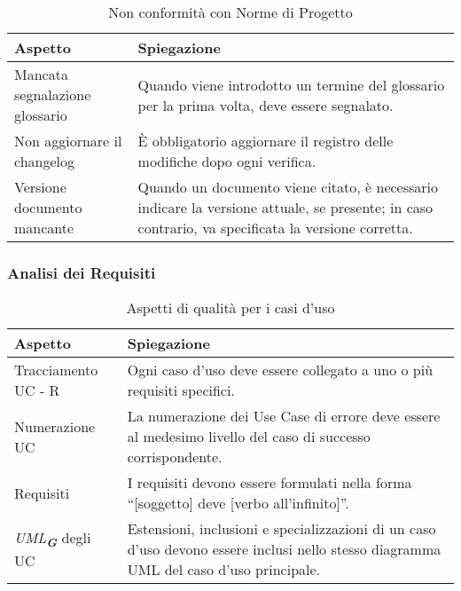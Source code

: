 \begin{table}[h!]
    \centering
    \renewcommand{\arraystretch}{1.5} %
    \begin{tabularx}{\textwidth}{|p{}|X|}
    \hline
    \rowcolor[HTML]{FFD700}
    \textbf{Aspetto} & \textbf{Spiegazione} \\ \hline
    Mancata segnalazione glossario & Quando viene introdotto un termine del glossario per la prima volta, deve essere segnalato. \\ \hline
    Non aggiornare il changelog & È obbligatorio aggiornare il registro delle modifiche dopo ogni verifica. \\ \hline
    Versione documento mancante & Quando un documento viene citato, è necessario indicare la versione attuale, se presente; in caso contrario, va specificata la versione corretta. \\ \hline
    \end{tabularx}
    \caption{Non conformità con Norme di Progetto}
\end{table}

\newpage
\subsubsection{Analisi dei Requisiti}
\begin{table}[h!]
    \centering
    \renewcommand{\arraystretch}{1.5} %
    \begin{tabularx}{\textwidth}{|p{}|X|}
    \hline
    \rowcolor[HTML]{FFD700}
    \textbf{Aspetto} & \textbf{Spiegazione} \\ \hline
    Tracciamento UC - R & Ogni caso d'uso deve essere collegato a uno o più requisiti specifici. \\ \hline
    Numerazione UC & La numerazione dei Use Case di errore deve essere al medesimo livello del caso di successo corrispondente. \\ \hline
    Requisiti & I requisiti devono essere formulati nella forma “[soggetto] deve [verbo all'infinito]”. \\ \hline
    \emph{UML}\textsubscript{\textit{\textbf{G}}} degli UC & Estensioni, inclusioni e specializzazioni di un caso d'uso devono essere inclusi nello stesso diagramma UML del caso d'uso principale. \\ \hline
    \end{tabularx}
    \caption{Aspetti di qualità per i casi d'uso}
\end{table}
